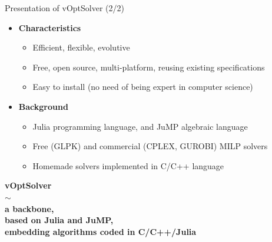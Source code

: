 \documentclass[10pt,xcolor=dvipsnames]{beamer}
\begin{document}
\begin{frame}{Presentation of vOptSolver (2/2)}

\begin{itemize}
%
%
%

\item \textbf{Characteristics}

\begin{itemize}
    \item Efficient, flexible, evolutive %
    \item Free, open source, multi-platform, reusing existing specifications
    \item Easy to install (no need of being expert in computer science)
\end{itemize}
\medskip

\item \textbf{Background}

\begin{itemize}
    \item Julia programming language, and JuMP algebraic language
    \item Free (GLPK) and commercial (CPLEX, GUROBI) MILP solvers
    \item Homemade solvers implemented in C/C++ language 
\end{itemize}

\end{itemize}

\begin{center}
\textbf{
 vOptSolver\\ $\sim$\\ a backbone, \\  based on Julia and JuMP, \\ embedding algorithms coded in C/C++/Julia
 }
\end{center}
\end{frame}
\end{document}
